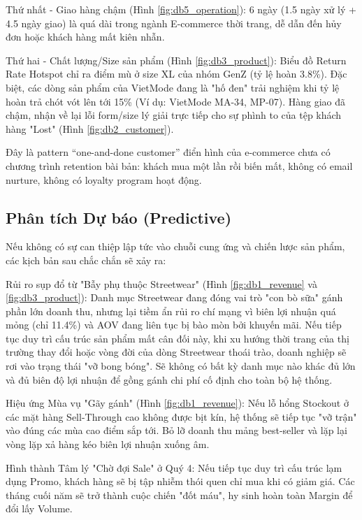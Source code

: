 \documentclass{article}
\begin{document}
Thứ nhất - Giao hàng chậm (Hình \ref{fig:db5_operation}): 6 ngày (1.5 ngày xử lý + 4.5 ngày giao) là quá dài trong ngành E-commerce thời trang, dễ dẫn đến hủy đơn hoặc khách hàng mất kiên nhẫn.

Thứ hai - Chất lượng/Size sản phẩm (Hình \ref{fig:db3_product}): Biểu đồ Return Rate Hotspot chỉ ra điểm mù ở size XL của nhóm GenZ (tỷ lệ hoàn 3.8\%). Đặc biệt, các dòng sản phẩm của VietMode đang là "hố đen" trải nghiệm khi tỷ lệ hoàn trả chót vót lên tới 15\% (Ví dụ: VietMode MA-34, MP-07). Hàng giao đã chậm, nhận về lại lỗi form/size lý giải trực tiếp cho sự phình to của tệp khách hàng "Lost" (Hình \ref{fig:db2_customer}).

Đây là pattern “one-and-done customer” điển hình của e-commerce chưa có chương trình retention bài bản: khách mua một lần rồi biến mất, không có email nurture, không có loyalty program hoạt động.




\subsection{Phân tích Dự báo (Predictive)}

Nếu không có sự can thiệp lập tức vào chuỗi cung ứng và chiến lược sản phẩm, các kịch bản sau chắc chắn sẽ xảy ra:

Rủi ro sụp đổ từ "Bẫy phụ thuộc Streetwear" (Hình \ref{fig:db1_revenue} và \ref{fig:db3_product}): Danh mục Streetwear đang đóng vai trò "con bò sữa" gánh phần lớn doanh thu, nhưng lại tiềm ẩn rủi ro chí mạng vì biên lợi nhuận quá mỏng (chỉ 11.4\%) và AOV đang liên tục bị bào mòn bởi khuyến mãi. Nếu tiếp tục duy trì cấu trúc sản phẩm mất cân đối này, khi xu hướng thời trang của thị trường thay đổi hoặc vòng đời của dòng Streetwear thoái trào, doanh nghiệp sẽ rơi vào trạng thái "vỡ bong bóng". Sẽ không có bất kỳ danh mục nào khác đủ lớn và đủ biên độ lợi nhuận để gồng gánh chi phí cố định cho toàn bộ hệ thống.

Hiệu ứng Mùa vụ "Gãy gánh" (Hình \ref{fig:db1_revenue}): Nếu lỗ hổng Stockout ở các mặt hàng Sell-Through cao không được bịt kín, hệ thống sẽ tiếp tục "vỡ trận" vào đúng các mùa cao điểm sắp tới. Bỏ lỡ doanh thu mảng best-seller và lặp lại vòng lặp xả hàng kéo biên lợi nhuận xuống âm.

Hình thành Tâm lý "Chờ đợi Sale" ở Quý 4: Nếu tiếp tục duy trì cấu trúc lạm dụng Promo, khách hàng sẽ bị tập nhiễm thói quen chỉ mua khi có giảm giá. Các tháng cuối năm sẽ trở thành cuộc chiến "đốt máu", hy sinh hoàn toàn Margin để đổi lấy Volume.
\end{document}
